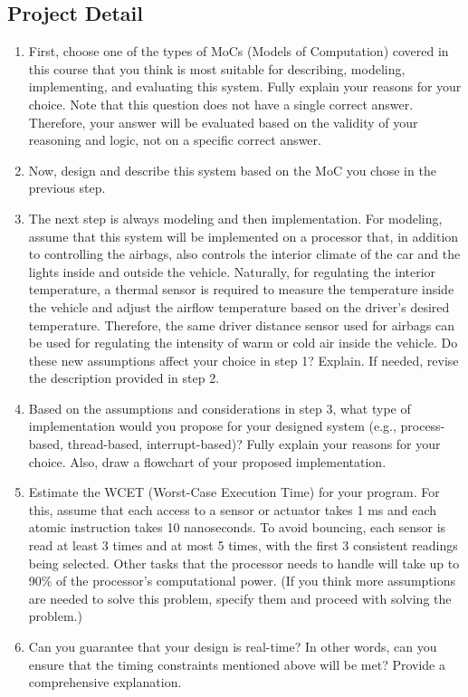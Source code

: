 \documentclass[12pt	]{article}
\begin{document}
\subsection{Project Detail}
\begin{enumerate}
	\item
	First, choose one of the types of MoCs (Models of Computation) covered in this course that you think is most suitable for describing, modeling, implementing, and evaluating this system. Fully explain your reasons for your choice. Note that this question does not have a single correct answer. Therefore, your answer will be evaluated based on the validity of your reasoning and logic, not on a specific correct answer. 
	
	\item 
	Now, design and describe this system based on the MoC you chose in the previous step. 
	
	\item 
	The next step is always modeling and then implementation. For modeling, assume that this system will be implemented on a processor that, in addition to controlling the airbags, also controls the interior climate of the car and the lights inside and outside the vehicle. Naturally, for regulating the interior temperature, a thermal sensor is required to measure the temperature inside the vehicle and adjust the airflow temperature based on the driver's desired temperature. Therefore, the same driver distance sensor used for airbags can be used for regulating the intensity of warm or cold air inside the vehicle. Do these new assumptions affect your choice in step 1? Explain. If needed, revise the description provided in step 2.
	
	\item 
	Based on the assumptions and considerations in step 3, what type of implementation would you propose for your designed system (e.g., process-based, thread-based, interrupt-based)? Fully explain your reasons for your choice. Also, draw a flowchart of your proposed implementation. 
	
	\item 
	Estimate the WCET (Worst-Case Execution Time) for your program. For this, assume that each access to a sensor or actuator takes 1 ms and each atomic instruction takes 10 nanoseconds. To avoid bouncing, each sensor is read at least 3 times and at most 5 times, with the first 3 consistent readings being selected. Other tasks that the processor needs to handle will take up to 90\% of the processor's computational power. (If you think more assumptions are needed to solve this problem, specify them and proceed with solving the problem.)
	
	\item 
	Can you guarantee that your design is real-time? In other words, can you ensure that the timing constraints mentioned above will be met? Provide a comprehensive explanation.
\end{enumerate}
\end{document}
